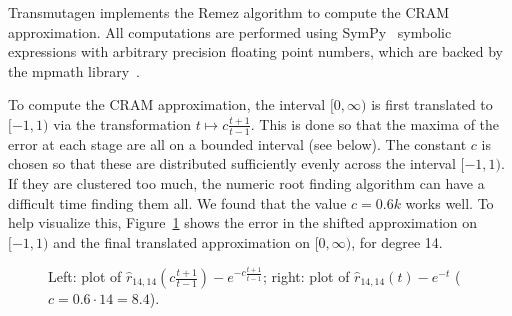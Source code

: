 Transmutagen implements the Remez algorithm to compute the CRAM approximation.
All computations are performed using SymPy~\cite{10.7717/peerj-cs.103}
symbolic expressions with arbitrary precision floating point numbers, which
are backed by the mpmath library~\cite{ationneeded}.

To compute the CRAM approximation, the interval $[0, \infty)$ is first
translated to $[-1, 1)$ via the transformation $t\mapsto c\frac{t+1}{t-1}$.
  This is done so that the maxima of the error at each
stage are all on a bounded interval (see below). The constant $c$ is chosen so
that these are distributed sufficiently evenly across the interval $[-1, 1)$.
If they are clustered too much, the numeric root finding algorithm can have a
difficult time finding them all. We found that the value $c=0.6k$ works well.
To help visualize this, Figure~\ref{fig:cram-plot} shows the error in the
shifted approximation on $[-1, 1)$ and the final translated approximation on
$[0, \infty)$, for degree 14.

\begin{figure}[!ht]
\centering
\resizebox{\textwidth}{!}{}
\caption{Left: plot of $\hat{r}_{14, 14}\left(c\frac{t+1}{t-1}\right) -
  e^{-c\frac{t+1}{t-1}}$; right: plot of $\hat{r}_{14, 14}(t) -
e^{-t}$ ($c=0.6\cdot14=8.4$).}
\label{fig:cram-plot}
\end{figure}

